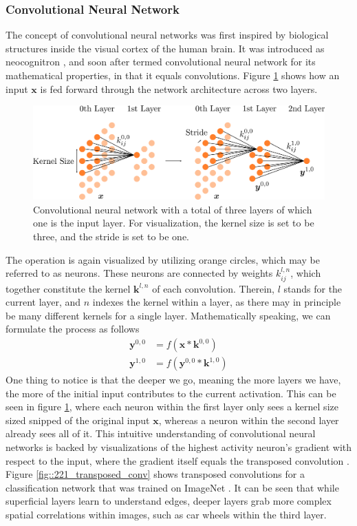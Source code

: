 \subsubsection{Convolutional Neural Network}
The concept of convolutional neural networks was first inspired by biological structures inside the visual cortex of the human brain. It was introduced as neocognitron \cite{fukushima1980neocognitron}, and soon after termed convolutional neural network for its mathematical properties, in that it equals convolutions. Figure \ref{fig::221_convolutional} shows how an input $\bm{x}$ is fed forward through the network architecture across two layers.   
\begin{figure}[h!]
	\centering
	\includegraphics[scale=.28]{chapters/02_background/img/convolutional.png}
	\caption{Convolutional neural network with a total of three layers of which one is the input layer. For visualization, the kernel size is set to be three, and the stride is set to be one.}
	\label{fig::221_convolutional}
\end{figure}
The operation is again visualized by utilizing orange circles, which may be referred to as neurons. These neurons are connected by weights $k^{l,n}_{ij}$, which together constitute the kernel $\bm{k}^{l,n}$ of each convolution. Therein, $l$ stands for the current layer, and $n$ indexes the kernel within a layer, as there may in principle be many different kernels for a single layer. Mathematically speaking, we can formulate the process as follows
\begin{align}
	\bm{y}^{0,0} &= f(\bm{x}*\bm{k}^{0,0}) \\
	\bm{y}^{1,0} &= f(\bm{y}^{0,0}*\bm{k}^{1,0})	
\end{align}
One thing to notice is that the deeper we go, meaning the more layers we have, the more of the initial input contributes to the current activation. This can be seen in figure \ref{fig::221_convolutional}, where each neuron within the first layer only sees a kernel size sized snipped of the original input $\bm{x}$, whereas a neuron within the second layer already sees all of it. This intuitive understanding of convolutional neural networks is backed by visualizations of the highest activity neuron's gradient with respect to the input, where the gradient itself equals the transposed convolution \cite{simonyan2013deep}.  Figure \ref{fig::221_transposed_conv} shows transposed convolutions for a classification network that was trained on ImageNet \cite{deng2009imagenet}. It can be seen that while superficial layers learn to understand edges, deeper layers grab more complex spatial correlations within images, such as car wheels within the third layer.
